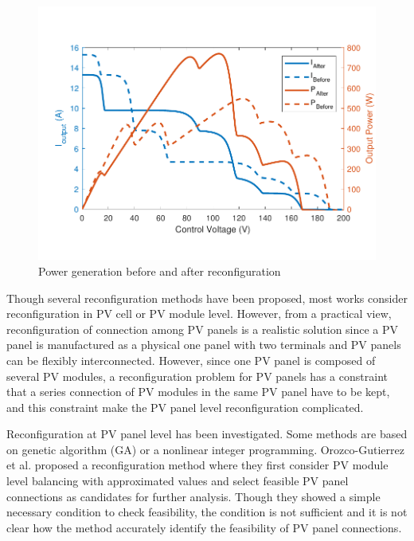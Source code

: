 \documentclass[conference]{IEEEtran}
\begin{document}
\begin{figure}
    \centering
    \includegraphics[width=0.6\linewidth]{PVSC-46/fig/compare.pdf}
    \caption{Power generation before and after reconfiguration}
    \label{compare}
\end{figure}


Though several reconfiguration methods have been proposed, most works consider reconfiguration in PV cell or PV module level\cite{storey2014optimized,udenze2018reconfiguration}.
However, from a practical view, reconfiguration of connection among PV panels is a realistic solution since a PV panel is manufactured as a physical one panel with two terminals and PV panels can be flexibly interconnected. However, since one PV panel is composed of several PV modules, a reconfiguration problem for PV panels has a constraint that a series connection of PV modules in the same PV panel have to be kept, and 
this constraint make the PV panel level reconfiguration complicated.



Reconfiguration at PV panel level has been investigated\cite{carotenuto2015evolutionary,hu2017non,orozco2016optimized}. 
Some methods are based on genetic algorithm (GA)\cite{carotenuto2015evolutionary} or a nonlinear integer programming\cite{hu2017non}.
Orozco-Gutierrez et al. proposed a reconfiguration method\cite{orozco2016optimized} where they first consider PV module level balancing with approximated values and select feasible PV panel connections as candidates for further analysis. 
Though they showed a simple necessary condition to check feasibility, the condition is not sufficient and it is not clear how the method accurately identify the feasibility of PV panel connections. 
\end{document}
